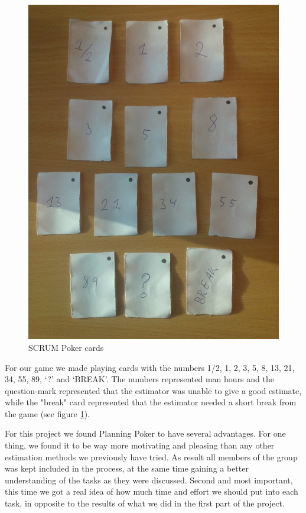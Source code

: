 \begin{figure}[t]
  \centering
  \includegraphics[width=\textwidth, angle=270]{illustrations/scrumPokerCards.jpg}
  \caption{SCRUM Poker cards}
  \label{fig:scrumPokerCards}
\end{figure}

For our game we made playing cards with the numbers 1/2, 1, 2, 3, 5, 8, 13, 21, 34, 55, 89, `?' and `BREAK'. The numbers represented man hours and the question-mark represented that the estimator was unable to give a good estimate, while the "break" card represented that the estimator needed a short break from the game (see figure \ref{fig:scrumPokerCards}).

For this project we found Planning Poker to have several advantages. For one thing, we found it to be way more motivating and pleasing than any other estimation methods we previously have tried. As result all members of the group was kept included in the process, at the same time gaining a better understanding of the tasks as they were discussed.
Second and most important, this time we got a real idea of how much time and effort we should put into each task, in opposite to the results of what we did in the first part of the project.

